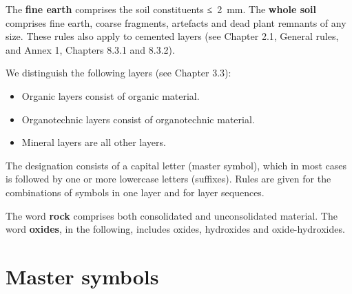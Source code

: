 \documentclass[
  letterpaper,
  DIV=11,
  numbers=noendperiod]{scrreprt}
\providecommand{\tightlist}{%
  \setlength{\itemsep}{0pt}\setlength{\parskip}{0pt}}\usepackage{longtable,booktabs,array}
\begin{document}
The \textbf{fine earth} comprises the soil constituents ≤~2~mm. The
\textbf{whole soil} comprises fine earth, coarse fragments, artefacts
and dead plant remnants of any size. These rules also apply to cemented
layers (see Chapter 2.1, General rules, and Annex 1, Chapters 8.3.1 and
8.3.2).

We distinguish the following layers (see Chapter 3.3):

\begin{itemize}
\tightlist
\item
  Organic layers consist of organic material.
\item
  Organotechnic layers consist of organotechnic material.
\item
  Mineral layers are all other layers.
\end{itemize}

The designation consists of a capital letter (master symbol), which in
most cases is followed by one or more lowercase letters (suffixes).
Rules are given for the combinations of symbols in one layer and for
layer sequences.

The word \textbf{rock} comprises both consolidated and unconsolidated
material. The word \textbf{oxides}, in the following, includes oxides,
hydroxides and oxide-hydroxides.

\hypertarget{master-symbols}{%
\section{Master symbols}\label{master-symbols}}
\end{document}
